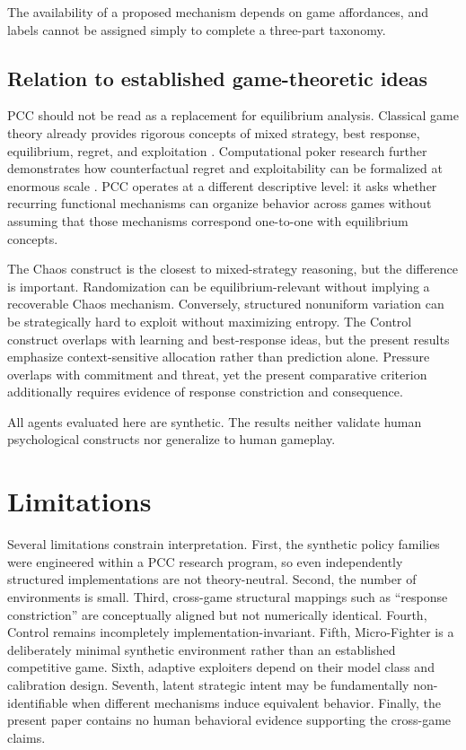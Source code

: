 \documentclass[journal]{IEEEtran}
\begin{document}
The availability of a proposed mechanism depends on game affordances, and labels cannot be assigned simply to complete a three-part taxonomy.

\subsection{Relation to established game-theoretic ideas}

PCC should not be read as a replacement for equilibrium analysis. Classical game theory already provides rigorous concepts of mixed strategy, best response, equilibrium, regret, and exploitation \cite{vonneumann1944,nash1950,osborne1994}. Computational poker research further demonstrates how counterfactual regret and exploitability can be formalized at enormous scale \cite{zinkevich2007,bowling2015,brown2018,brown2019}. PCC operates at a different descriptive level: it asks whether recurring functional mechanisms can organize behavior across games without assuming that those mechanisms correspond one-to-one with equilibrium concepts.

The Chaos construct is the closest to mixed-strategy reasoning, but the difference is important. Randomization can be equilibrium-relevant without implying a recoverable Chaos mechanism. Conversely, structured nonuniform variation can be strategically hard to exploit without maximizing entropy. The Control construct overlaps with learning and best-response ideas, but the present results emphasize context-sensitive allocation rather than prediction alone. Pressure overlaps with commitment and threat, yet the present comparative criterion additionally requires evidence of response constriction and consequence.

All agents evaluated here are synthetic. The results neither validate human psychological constructs nor generalize to human gameplay.

\section{Limitations}

Several limitations constrain interpretation. First, the synthetic policy families were engineered within a PCC research program, so even independently structured implementations are not theory-neutral. Second, the number of environments is small. Third, cross-game structural mappings such as ``response constriction'' are conceptually aligned but not numerically identical. Fourth, Control remains incompletely implementation-invariant. Fifth, Micro-Fighter is a deliberately minimal synthetic environment rather than an established competitive game. Sixth, adaptive exploiters depend on their model class and calibration design. Seventh, latent strategic intent may be fundamentally non-identifiable when different mechanisms induce equivalent behavior. Finally, the present paper contains no human behavioral evidence supporting the cross-game claims. 
\end{document}
